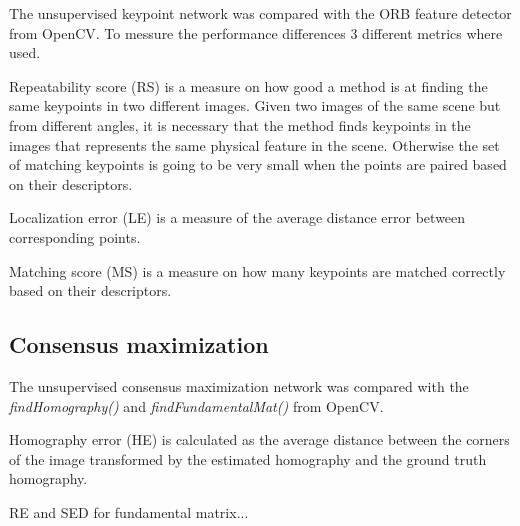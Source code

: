 The unsupervised keypoint network was compared with the ORB feature detector from OpenCV. To messure the performance differences 3 different metrics where used.

Repeatability score (RS) is a measure on how good a method is at finding the same keypoints in two different images. Given two images of the same scene but from different angles, it is necessary that the method finds keypoints in the images that represents the same physical feature in the scene. Otherwise the set of matching keypoints is going to be very small when the points are paired based on their descriptors.

Localization error (LE) is a measure of the average distance error between corresponding points.

Matching score (MS) is a measure on how many keypoints are matched correctly based on their descriptors.

\subsection{Consensus maximization}

The unsupervised consensus maximization network was compared with the \textit{findHomography()} and \textit{findFundamentalMat()} from OpenCV.

Homography error (HE) is calculated as the average distance between the corners of the image transformed by the estimated homography and the ground truth homography.

RE and SED for fundamental matrix...
